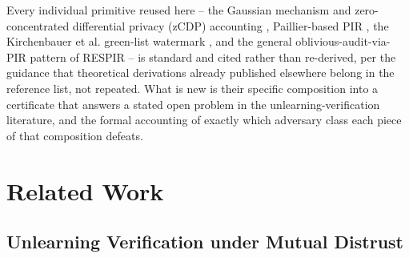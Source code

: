 \documentclass[10pt,journal,compsoc]{IEEEtran}
\begin{document}
Every individual primitive reused here -- the Gaussian mechanism and zero-concentrated differential privacy (zCDP) accounting \cite{bun2016concentrated}, Paillier-based PIR \cite{paillier1999}, the Kirchenbauer et al. green-list watermark \cite{kirchenbauer2023watermark}, and the general oblivious-audit-via-PIR pattern of RESPIR \cite{godinot2026respir} -- is standard and cited rather than re-derived, per the guidance that theoretical derivations already published elsewhere belong in the reference list, not repeated. What is new is their specific composition into a certificate that answers a stated open problem in the unlearning-verification literature, and the formal accounting of exactly which adversary class each piece of that composition defeats.

\section{Related Work}
\label{sec:related}

\subsection{Unlearning Verification under Mutual Distrust}
\end{document}
